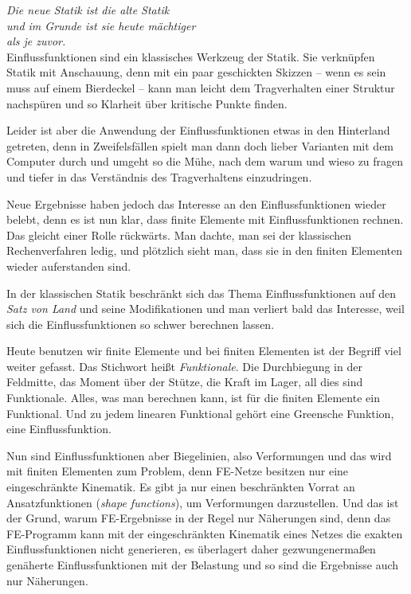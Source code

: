 \preface
{\em Die neue Statik ist die alte Statik\\
und im Grunde ist sie heute m\"{a}chtiger\\
als je zuvor.\/}\\

Einflussfunktionen sind ein klassisches Werkzeug der Statik. Sie verkn\"{u}p\-fen Statik mit Anschauung, denn mit ein paar geschickten Skizzen -- wenn es sein muss auf einem Bierdeckel -- kann man leicht dem Tragverhalten einer Struktur nachsp\"{u}ren und so Klarheit \"{u}ber kritische Punkte finden.

Leider ist aber die Anwendung der Einflussfunktionen etwas in den Hinterland getreten, denn in Zweifelsf\"{a}llen spielt man dann doch lieber Varianten mit dem Computer durch und umgeht so die M\"{u}he, nach dem warum und wieso zu fragen und tiefer in das Verst\"{a}ndnis des Tragverhaltens einzudringen.

Neue Ergebnisse haben jedoch das Interesse an den Einflussfunktionen wieder belebt, denn es ist nun klar, dass finite Elemente mit Einflussfunktionen rechnen. Das gleicht einer Rolle r\"{u}ckw\"{a}rts. Man dachte, man sei der klassischen Rechenverfahren ledig, und pl\"{o}tzlich sieht man, dass sie in den finiten Elementen wieder auferstanden sind.

In der klassischen Statik beschr\"{a}nkt sich das Thema Einflussfunktionen auf den {\em Satz von Land\/} und seine Modifikationen und man verliert bald das Interesse, weil sich die Einflussfunktionen so schwer berechnen lassen.

Heute benutzen wir finite Elemente und bei finiten Elementen ist der Begriff viel weiter gefasst. Das Stichwort hei{\ss}t {\em Funktionale\/}. Die Durchbiegung in der Feldmitte, das Moment \"{u}ber der St\"{u}tze, die Kraft im Lager, all dies sind Funktionale. Alles, was man berechnen kann, ist f\"{u}r die finiten Elemente ein Funktional. Und zu jedem linearen Funktional geh\"{o}rt eine Greensche Funktion, eine Einflussfunktion.

Nun sind Einflussfunktionen aber Biegelinien, also Verformungen und das wird mit finiten Elementen zum Problem, denn FE-Netze besitzen nur eine eingeschr\"{a}nkte Kinematik. Es gibt ja nur einen beschr\"{a}nkten Vorrat an Ansatzfunktionen ({\em shape functions\/}), um Verformungen darzustellen. Und das ist der Grund, warum FE-Ergebnisse in der Regel nur N\"{a}herungen sind, denn das FE-Programm kann mit der eingeschr\"{a}nkten Kinematik eines Netzes die exakten Einflussfunktionen nicht generieren, es \"{u}berlagert daher gezwungenerma{\ss}en gen\"{a}herte Einflussfunktionen mit der Belastung und so sind die Ergebnisse auch nur N\"{a}herungen.

